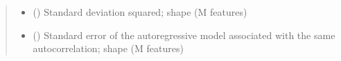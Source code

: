 \documentclass[letterpaper,10pt,english]{sphinxmanual}
\begin{document}
\begin{fulllineitems}
\begin{quote}
\begin{description}
\begin{itemize}
\item {}
\sphinxAtStartPar
{} () \textendash{} Standard deviation squared;
shape  (M features)

\item {}
\sphinxAtStartPar
{} () \textendash{} Standard error of the autoregressive model associated with
the same autocorrelation;
shape  (M features)

\end{itemize}


\end{description}\end{quote}

\end{fulllineitems}

\end{document}
